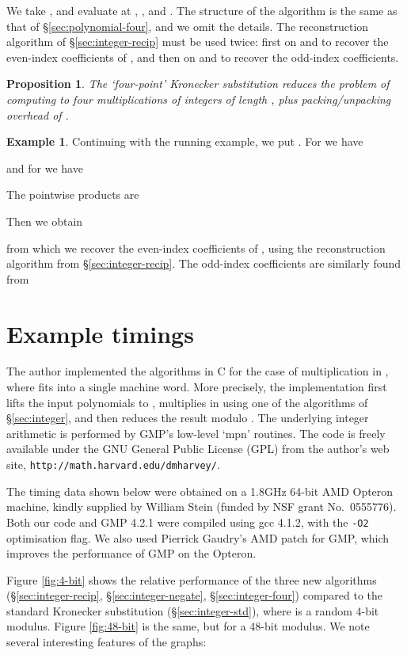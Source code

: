 \documentclass{amsart}
\newtheorem{prop}[thm]{Proposition}
\theoremstyle{definition}
\newtheorem{example}[thm]{Example}
\theoremstyle{remark}
\begin{document}
We take , and evaluate at , ,  and . The structure of the algorithm is the same as that of \S\ref{sec:polynomial-four}, and we omit the details. The reconstruction algorithm of \S\ref{sec:integer-recip} must be used twice: first on  and  to recover the even-index coefficients of , and then on  and  to recover the odd-index coefficients.

\begin{prop}
\label{prop:integer-four-ks}
The `four-point' Kronecker substitution reduces the problem of computing  to four multiplications of integers of length , plus packing/unpacking overhead of .
\end{prop}

\begin{example}
Continuing with the running example, we put . For  we have

and for  we have

The pointwise products are

Then we obtain

from which we recover the even-index coefficients of , using the reconstruction algorithm from \S\ref{sec:integer-recip}. The odd-index coefficients are similarly found from

\end{example}


\section{Example timings}
\label{sec:demo}

The author implemented the algorithms in C for the case of multiplication in , where  fits into a single machine word. More precisely, the implementation first lifts the input polynomials to , multiplies in  using one of the algorithms of \S\ref{sec:integer}, and then reduces the result modulo . The underlying integer arithmetic is performed by GMP's low-level `mpn' routines. The code is freely available under the GNU General Public License (GPL) from the author's web site, \texttt{http://math.harvard.edu/dmharvey/}.

The timing data shown below were obtained on a 1.8GHz 64-bit AMD Opteron machine, kindly supplied by William Stein (funded by NSF grant No.~0555776). Both our code and GMP 4.2.1 were compiled using gcc 4.1.2, with the \texttt{-O2} optimisation flag. We also used Pierrick Gaudry's AMD patch for GMP, which improves the performance of GMP on the Opteron.

Figure \ref{fig:4-bit} shows the relative performance of the three new algorithms (\S\ref{sec:integer-recip}, \S\ref{sec:integer-negate}, \S\ref{sec:integer-four}) compared to the standard Kronecker substitution (\S\ref{sec:integer-std}), where  is a random 4-bit modulus. Figure \ref{fig:48-bit} is the same, but for a 48-bit modulus. We note several interesting features of the graphs:
\end{document}
